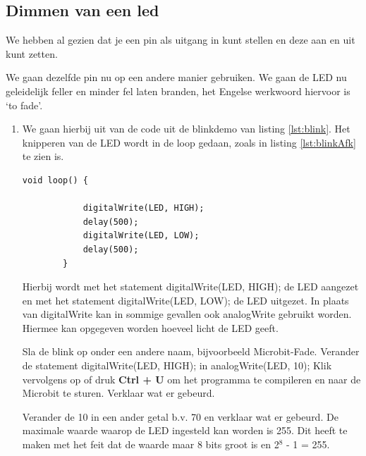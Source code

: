 \subsection{Dimmen van een led}
 
 We hebben al gezien dat je een pin als uitgang in kunt stellen en deze aan en uit kunt zetten.
 
 We gaan dezelfde pin nu op een andere manier gebruiken. We gaan de LED nu geleidelijk feller en minder fel laten branden, het Engelse werkwoord hiervoor is ‘to fade’. 
  \begin{enumerate}
 	\item  We gaan hierbij uit van de code uit de blinkdemo van listing \ref{lst:blink}.  Het knipperen van de LED wordt
 	in de \textcolor{arduinoGreen}{loop} gedaan, zoals in listing \ref{lst:blinkAfk} te zien is.
  	\begin{lstlisting}[caption= Het knipperen van de LED.,label={lst:blinkAfk},firstnumber=15]		
 		void loop() {
 			
 			digitalWrite(LED, HIGH);
 			delay(500);
 			digitalWrite(LED, LOW);
 			delay(500);
 		}
 	\end{lstlisting} 
 	Hierbij wordt met het statement \textcolor{arduinoOrange}{digitalWrite}(LED, \textcolor{arduinoBlue}{HIGH}); de LED aangezet en met het statement \textcolor{arduinoOrange}{digitalWrite}(LED, \textcolor{arduinoBlue}{LOW}); de LED uitgezet.  In plaats van \textcolor{arduinoOrange}{digitalWrite} kan in sommige gevallen ook \textcolor{arduinoOrange}{analogWrite} gebruikt worden. Hiermee kan opgegeven worden hoeveel licht de LED geeft.
 	
 	Sla de blink op onder een andere naam, bijvoorbeeld Microbit-Fade. Verander de statement  \textcolor{arduinoOrange}{digitalWrite}(LED, \textcolor{arduinoBlue}{HIGH}); in \textcolor{arduinoOrange}{analogWrite}(LED, 10);
 	Klik vervolgens op  of druk \colorbox{mygray}{\textbf{Ctrl + U}} om het programma te compileren en naar de Microbit te sturen. Verklaar wat er gebeurd.
 	
 	Verander de 10 in een ander getal b.v. 70 en verklaar wat er gebeurd. De maximale waarde waarop de LED ingesteld kan worden is 255. Dit heeft te maken met het feit dat de waarde maar 8 bits groot is en 2$^{8}$ - 1 = 255.
 

\end{enumerate}
